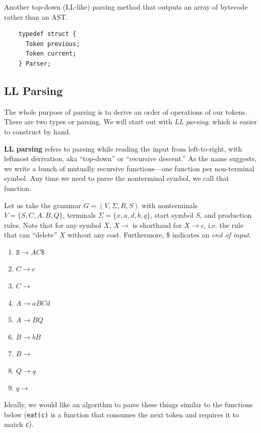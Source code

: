   Another top-down (LL-like) parsing method that outputs an array of bytecode rather than an AST. 

  \begin{lstlisting}
    typedef struct {
      Token previous; 
      Token current;
    } Parser;
  \end{lstlisting}

\subsection{LL Parsing} 

  The whole purpose of parsing is to derive an order of operations of our tokens. There are two types or parsing. We will start out with \textit{LL parsing}, which is easier to construct by hand. 

  \begin{definition}[LL Parsing]
    \label{def:ll-parsing}
    \textbf{LL parsing} refers to parsing while reading the input from left-to-right, with leftmost derivation, aka ``top-down'' or ``recursive descent.'' As the name suggests, we write a bunch of mutually recursive functions---one function per non-terminal symbol. Any time we need to parse the nonterminal symbol, we call that function. 
  \end{definition}

  Let us take the grammar $G = (V, \Sigma, R, S)$ with nonterminals $V = \{S, C, A, B, Q \}$, terminals $\Sigma = \{x, a, d, b, q\}$, start symbol $S$, and production rules. Note that for any symbol $X$, $X \to$ is shorthand for $X \to \epsilon$, i.e. the rule that can ``delete'' $X$ without any cost. Furthermore, \$ indicates an \textit{end of input}. 
  \begin{enumerate}
    \item $\texttt{S} \to AC\$$
    \item $C \to c$
    \item $C \to $
    \item $A \to aBCd$
    \item $A \to BQ$
    \item $B \to bB$
    \item $B \to $
    \item $Q \to q$
    \item $q \to $
  \end{enumerate} 
  Ideally, we would like an algorithm to parse these things similar to the functions below (\texttt{eat(c)} is a function that consumes the next token and requires it to match \texttt{c}). 


